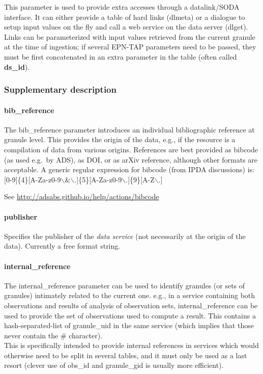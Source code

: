 \documentclass[11pt,a4paper]{ivoa}
\begin{document}
This parameter is used to provide extra accesses through a datalink/SODA
interface. It can either provide a table of hard links (dlmeta) or a
dialogue to setup input values on the fly and call a web service on
the data server (dlget). Links can be parameterized with input values
retrieved from the current granule at the time of ingestion; if several
EPN-TAP parameters need to be passed, they must be first concatenated
in an extra parameter in the table (often called \textbf{ds\_id}).

\subsubsection{Supplementary description}

\paragraph{bib\_reference}

The bib\_reference parameter introduces an individual bibliographic
reference at granule level. This provides the origin of the
data, e.g., if the resource is a compilation of data from various
origins. References are best provided as bibcode (as used e.g.\ by ADS),
as DOI, or as arXiv reference, although other formats are acceptable. A
generic regular expression for bibcode (from IPDA discussions) is:
[0-9]\{4\}[A-Za-z0-9$\backslash$\&$\backslash$.]\{5\}[A-Za-z0-9$\backslash$.]\{9\}[A-Z$\backslash$.]

See \url{http://adsabs.github.io/help/actions/bibcode}

\paragraph{publisher}

Specifies the publisher of the \emph{data service} (not necessarily at
the origin of the data). Currently a free format string.

\paragraph{internal\_reference}

The internal\_reference parameter can be used to identify granules
(or sets of granules) intimately related to the current one. e.g.,
in a service containing both observations and results of analysis of
observation sets, internal\_reference can be used to provide the set of
observations used to compute a result. This contains a hash-separated-list
of granule\_uid in the same service (which implies that those never
contain the \# character).\\This is specifically intended to provide
internal references in services which would otherwise need to be split
in several tables, and it must only be used as a last resort (clever
use of obs\_id and granule\_gid is usually more efficient).
\end{document}
